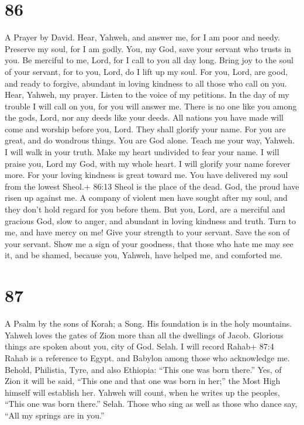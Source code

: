 \hypertarget{section-76}{%
\section{86}\label{section-76}}

A Prayer by David.  Hear, Yahweh, and answer me, for I am
poor and needy.  Preserve my soul, for I am godly. You, my
God, save your servant who trusts in you.  Be merciful to
me, Lord, for I call to you all day long.  Bring joy to the
soul of your servant, for to you, Lord, do I lift up my soul.
 For you, Lord, are good, and ready to forgive, abundant in
loving kindness to all those who call on you.  Hear, Yahweh,
my prayer. Listen to the voice of my petitions.  In the day
of my trouble I will call on you, for you will answer me. 
There is no one like you among the gods, Lord, nor any deeds like your
deeds.  All nations you have made will come and worship
before you, Lord. They shall glorify your name.  For you
are great, and do wondrous things. You are God alone. 
Teach me your way, Yahweh. I will walk in your truth. Make my heart
undivided to fear your name.  I will praise you, Lord my
God, with my whole heart. I will glorify your name forever more.
 For your loving kindness is great toward me. You have
delivered my soul from the lowest Sheol.+ 86:13 Sheol is the place of
the dead.  God, the proud have risen up against me. A
company of violent men have sought after my soul, and they don't hold
regard for you before them.  But you, Lord, are a merciful
and gracious God, slow to anger, and abundant in loving kindness and
truth.  Turn to me, and have mercy on me! Give your
strength to your servant. Save the son of your servant. 
Show me a sign of your goodness, that those who hate me may see it, and
be shamed, because you, Yahweh, have helped me, and comforted me.

\hypertarget{section-77}{%
\section{87}\label{section-77}}

A Psalm by the sons of Korah; a Song.  His foundation is in
the holy mountains.  Yahweh loves the gates of Zion more
than all the dwellings of Jacob.  Glorious things are spoken
about you, city of God. Selah.  I will record Rahab+ 87:4
Rahab is a reference to Egypt. and Babylon among those who acknowledge
me. Behold, Philistia, Tyre, and also Ethiopia: ``This one was born
there.''  Yes, of Zion it will be said, ``This one and that
one was born in her;'' the Most High himself will establish her.
 Yahweh will count, when he writes up the peoples, ``This
one was born there.'' Selah.  Those who sing as well as
those who dance say, ``All my springs are in you.''

